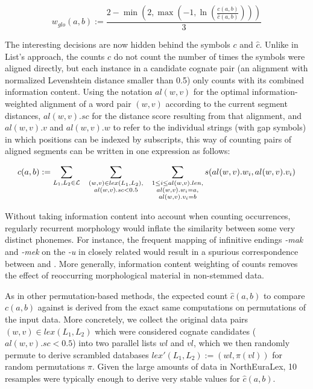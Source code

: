 \begin{equation}
  w_{glo}(a,b) := \frac{2 - \min\left(2,\max\left(-1,\ln \left( \frac{c(a,b)}{\hat{c}(a,b)} \right)\right)\right)}{3}
\end{equation}

The interesting decisions are now hidden behind the symbols $c$ and $\hat{c}$. Unlike in List's approach, the counts $c$ do not count the number of times the symbols were aligned directly, but each instance in a candidate cognate pair (an alignment with normalized Levenshtein distance smaller than 0.5) only counts with its combined information content. Using the notation $al(w,v)$ for the optimal information-weighted alignment of a word pair $(w,v)$ according to the current segment distances, $al(w,v).sc$ for the distance score resulting from that alignment, and $al(w,v).v$ and $al(w,v).w$ to refer to the individual strings (with gap symbols) in which positions can be indexed by subscripts, this way of counting pairs of aligned segments can be written in one expression as follows:

\begin{equation}
 c(a,b) := \sum_{L_1,L_2 \in \mathcal L} \hspace*{0.3cm} \sum_{\substack{(w,v) \in lex(L_1,L_2),\\ al(w,v).sc < 0.5}} \hspace*{0.3cm} \sum_{\substack{1 \leq i \leq al(w,v).len,\\ al(w,v).w_i = a,\\ al(w,v).v_i = b}} s(al(w,v).w_i,al(w,v).v_i)
\end{equation}

Without taking information content into account when counting occurrences, regularly recurrent morphology would inflate the similarity between some very distinct phonemes. For instance, the frequent mapping of  infinitive endings \textit{-mak} and \textit{-mek} on the \textit{-u} in closely related  would result in a spurious correspondence between \ipa{[m]} and \ipa{[u]}. More generally, information content weighting of counts removes the effect of reoccurring morphological material in non-stemmed data.

As in other permutation-based methods, the expected count $\hat{c}(a,b)$ to compare $c(a,b)$ against is derived from the exact same computations on permutations of the input data. More concretely, we collect the original data pairs $(w,v) \in lex(L_1,L_2)$ which were considered cognate candidates ($al(w,v).sc < 0.5$) into two parallel lists $wl$ and $vl$, which we then randomly permute to derive scrambled databases $lex'(L_1,L_2) := (wl,\pi(vl))$ for random permutations $\pi$. Given the large amounts of data in NorthEuraLex, 10 resamples were typically enough to derive very stable values for $\hat{c}(a,b)$.

